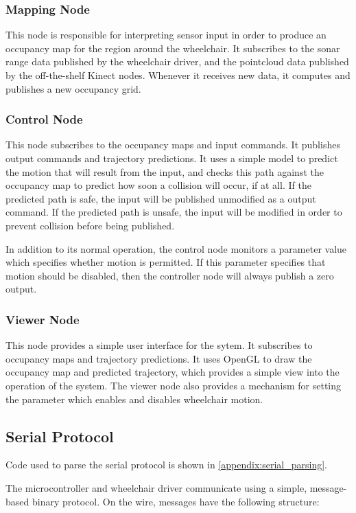\documentclass[oneside,final,a4paper]{report}
\begin{document}
\subsubsection{Mapping Node} 
This node is responsible for interpreting sensor input in order to produce an occupancy map for the region around the wheelchair.  It subscribes to the sonar range data published by the wheelchair driver, and the pointcloud data published by the off-the-shelf Kinect nodes.  Whenever it receives new data, it computes and publishes a new occupancy grid.

\subsubsection{Control Node}
This node subscribes to the occupancy maps and input commands.  It publishes output commands and trajectory predictions.  It uses a simple model to predict the motion that will result from the input, and checks this path against the occupancy map to predict how soon a collision will occur, if at all.  If the predicted path is safe, the input will be published unmodified as a output command.  If the predicted path is unsafe, the input will be modified in order to prevent collision before being published.

In addition to its normal operation, the control node monitors a parameter value which specifies whether motion is permitted.  If this parameter specifies that motion should be disabled, then the controller node will always publish a zero output.

\subsubsection{Viewer Node}
This node provides a simple user interface for the sytem.  It subscribes to occupancy maps and trajectory predictions.  It uses OpenGL to draw the occupancy map and predicted trajectory, which provides a simple view into the operation of the system.  The viewer node also provides a mechanism for setting the parameter which enables and disables wheelchair motion.

\subsection{Serial Protocol}
Code used to parse the serial protocol is shown in \ref{appendix:serial_parsing}.

The microcontroller and wheelchair driver communicate using a simple, message-based binary protocol.  On the wire, messages have the following structure:
\end{document}
